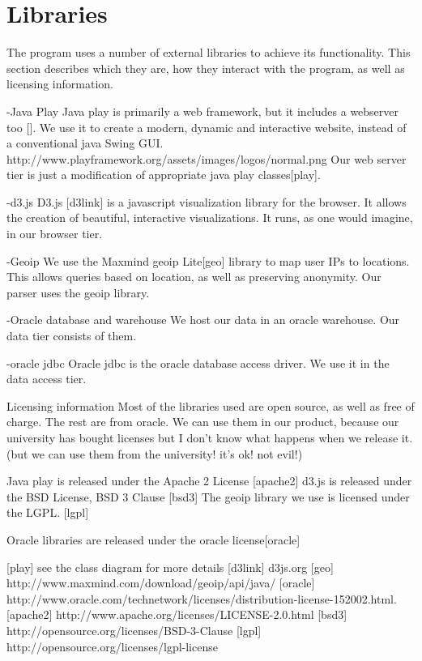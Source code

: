 \section{Libraries}

The program uses a number of external libraries to achieve its functionality. This section describes which they are,
how they interact with the program, as well as licensing information. 

-Java Play
Java play is primarily a web framework, but it includes a webserver too [].
We use it to create a modern, dynamic and interactive website, instead of a conventional java Swing GUI.
http://www.playframework.org/assets/images/logos/normal.png
Our web server tier is just a modification of appropriate java play classes[play].

-d3.js
D3.js [d3link] is a javascript visualization library for the browser.
It allows the creation of beautiful, interactive visualizations.
It runs, as one would imagine, in our browser tier.

-Geoip
We use the Maxmind geoip Lite[geo] library to map user IPs to locations.
This allows queries based on location, as well as preserving anonymity.
Our parser uses the geoip library.

-Oracle database and warehouse
We host our data in an oracle warehouse.
Our data tier consists of them.

-oracle jdbc
Oracle jdbc is the oracle database access driver. We use it in the data access tier.



Licensing information
Most of the libraries used are open source, as well as free of charge.
The rest are from oracle. We can use them in our product, because our university has bought licenses but I don't know what happens when we release it.
(but we can use them from the university! it's ok! not evil!)

Java play is released under the Apache 2 License [apache2]
d3.js is released under the BSD License, BSD 3 Clause [bsd3]
The geoip library we use is licensed under the LGPL. [lgpl]

Oracle libraries are released under the oracle license[oracle]




[play] see the class diagram for more details
[d3link] d3js.org
[geo] http://www.maxmind.com/download/geoip/api/java/
[oracle] http://www.oracle.com/technetwork/licenses/distribution-license-152002.html.
[apache2] http://www.apache.org/licenses/LICENSE-2.0.html
[bsd3]  http://opensource.org/licenses/BSD-3-Clause
[lgpl] http://opensource.org/licenses/lgpl-license
